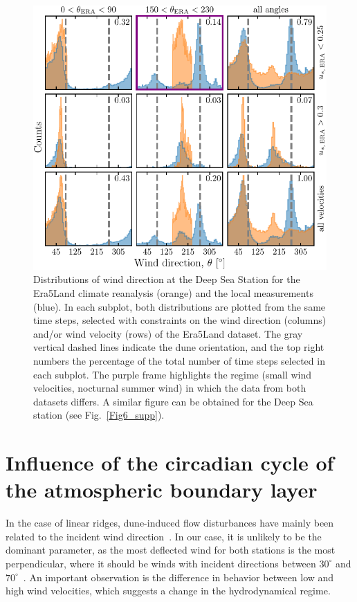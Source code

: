   \begin{figure}
    \centering
    \includegraphics[scale=1]{Figures/Figure3.pdf}
    \caption{Distributions of wind direction at the Deep Sea Station for the Era5Land climate reanalysis (orange) and the local measurements (blue). In each subplot, both distributions are plotted from the same time steps, selected with constraints on the wind direction (columns) and/or wind velocity (rows) of the Era5Land dataset. The gray vertical dashed lines indicate the dune orientation, and the top right numbers the percentage of the total number of time steps selected in each subplot. The purple frame highlights the regime (small wind velocities, nocturnal summer wind) in which the data from both datasets differs. A similar figure can be obtained for the Deep Sea station (see Fig.~\ref{Fig6_supp}).}
    \label{Fig3}
  \end{figure}


  \section{Influence of the circadian cycle of the atmospheric boundary layer}

  In the case of linear ridges, dune-induced flow disturbances have mainly been related to the incident wind direction~\citep{Walker2009, Hesp2015}. In our case, it is unlikely to be the dominant parameter, as the most deflected wind for both stations is the most perpendicular, where it should be winds with incident directions between $30^{\circ}$ and $70^{\circ}$~\citep{Hesp2015}. An important observation is the difference in behavior between low and high wind velocities, which suggests a change in the hydrodynamical regime.

